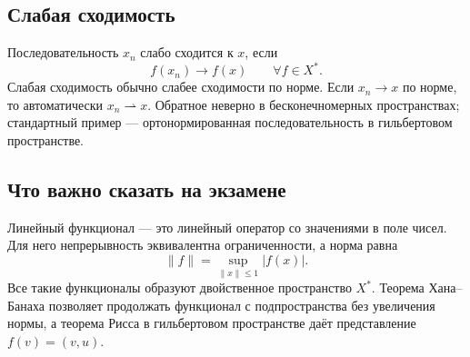 \subsection{Слабая сходимость}

Последовательность $x_n$ слабо сходится к $x$, если
\[
    f(x_n)\to f(x)\qquad \forall f\in X^*.
\]
Слабая сходимость обычно слабее сходимости по норме. Если $x_n\to x$ по норме,
то автоматически $x_n\rightharpoonup x$. Обратное неверно в бесконечномерных
пространствах; стандартный пример --- ортонормированная последовательность в
гильбертовом пространстве.

\subsection{Что важно сказать на экзамене}

Линейный функционал --- это линейный оператор со значениями в поле чисел.
Для него непрерывность эквивалентна ограниченности, а норма равна
\[
    \|f\|=\sup_{\|x\|\leq1}|f(x)|.
\]
Все такие функционалы образуют двойственное пространство $X^*$. Теорема
Хана--Банаха позволяет продолжать функционал с подпространства без увеличения
нормы, а теорема Рисса в гильбертовом пространстве даёт представление
$f(v)=(v,u)$.

\newpage
